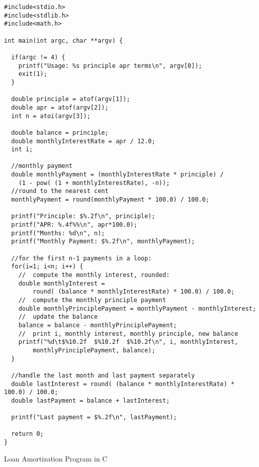 \begin{listing}
\begin{verbatim}
#include<stdio.h>
#include<stdlib.h>
#include<math.h>

int main(int argc, char **argv) {

  if(argc != 4) {
    printf("Usage: %s principle apr terms\n", argv[0]);
    exit(1);
  }

  double principle = atof(argv[1]);
  double apr = atof(argv[2]);
  int n = atoi(argv[3]);

  double balance = principle;
  double monthlyInterestRate = apr / 12.0;
  int i;

  //monthly payment  
  double monthlyPayment = (monthlyInterestRate * principle) / 
  	(1 - pow( (1 + monthlyInterestRate), -n));
  //round to the nearest cent
  monthlyPayment = round(monthlyPayment * 100.0) / 100.0;

  printf("Principle: $%.2f\n", principle);
  printf("APR: %.4f%%\n", apr*100.0);
  printf("Months: %d\n", n);
  printf("Monthly Payment: $%.2f\n", monthlyPayment);

  //for the first n-1 payments in a loop:
  for(i=1; i<n; i++) {  
    //  compute the monthly interest, rounded:
    double monthlyInterest = 
    	round( (balance * monthlyInterestRate) * 100.0) / 100.0;
    //  compute the monthly principle payment
    double monthlyPrinciplePayment = monthlyPayment - monthlyInterest;
    //  update the balance
    balance = balance - monthlyPrinciplePayment;
    //  print i, monthly interest, monthly principle, new balance
    printf("%d\t$%10.2f  $%10.2f  $%10.2f\n", i, monthlyInterest, 
    	monthlyPrinciplePayment, balance);
  }

  //handle the last month and last payment separately
  double lastInterest = round( (balance * monthlyInterestRate) * 100.0) / 100.0;
  double lastPayment = balance + lastInterest;

  printf("Last payment = $%.2f\n", lastPayment);

  return 0;
}
\end{verbatim}
\caption{Loan Amortization Program in C}
\label{code:c:loanAmortization}
\end{listing}

